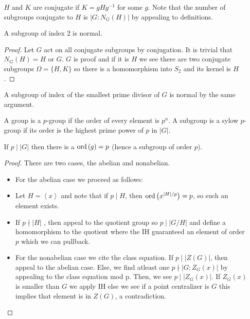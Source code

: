 \begin{definition}
	\(H\) and \(K\) are conjugate if \(K = gHg^{-1}\) for some \(g\). Note that the number of subgroups conjugate to \(H\) is \(\left| G : N_{G}\left( H \right)  \right| \) by appealing to definitions.
\end{definition}
\begin{theorem}
	A subgroup of index \(2\) is normal.
\end{theorem}
\begin{proof}
	Let \(G\) act on all conjugate subgroups by conjugation. It is trivial that \(N_{G}\left( H \right)  = H\)  or \(G\). \(G\) is proof and if it is \(H\) we see there are two conjugate subgroups \(\Omega = \{H, K\} \)  so there is a homomorphism into \(S_2\) and its kernel is \(H\).
\end{proof}
\begin{remark}
A subgroup of index of the smallest prime divisor of \(G\) is normal by the same argument.
\end{remark}
\begin{definitions}
	A group is a \(p\)-group if the order of every element is \(p^{n}\). A subgroup is a sylow \(p\)-group if its order is the highest prime power of \(p\)  in \(\left| G \right| \).
\end{definitions}
\begin{theorem}
	If \(p \mid \left| G \right| \) 	then there is a \(\operatorname{ord} \left( g \right)  = p\) (hence a subgroup of order \(p\)).
\end{theorem}
\begin{proof}
	There are two cases, the abelian and nonabelian.
	\begin{itemize}
		\item For the abelian case we proceed as follows:
		\item Let \(H = \left<x \right> \) and note  that if \(p \mid H\), then \(\operatorname{ord} \left( x^{\left| H \right|/p} \right) = p \), so such an element exists.
\item If \(p \nmid \left| H \right| \) , then appeal to the quotient group so \(p \mid \left| G / H \right| \) and define a homomorphism to the quotient where the IH guaranteed an element of order \(p\) which we can pullback.
\item For the nonabelian case we cite the class equation. If \(p \mid \left| Z\left( G \right)  \right| \), then appeal to the abelian case. Else, we find atleast one \(p \nmid \left| G : Z_{G}\left( x \right)  \right| \) by appealing to the class equation mod p. Then, we see \(p \mid \left| Z_{G}\left( x \right)  \right| \). If \(Z_{G}\left( x \right) \) is smaller than \(G\) we apply IH else we see if a point centralizer is \(G\) this implies that element is in \(Z\left( G \right) \), a contradiction.
	\end{itemize}
\end{proof}
